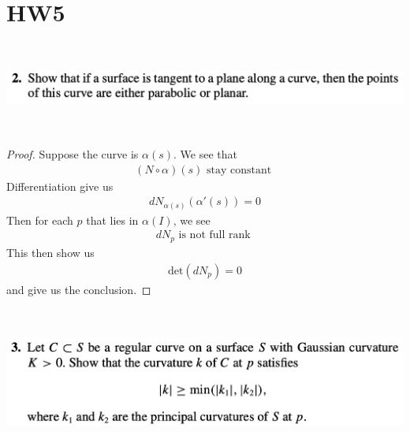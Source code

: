 \documentclass{report}
\begin{document}
\section{HW5}
\begin{question}{}{}
\includegraphics[height=3cm,width=18cm]{hw5q1}
\end{question}
\begin{proof}
Suppose the curve is $\alpha (s)$. We see that 
\begin{align*}
  (N\circ \alpha)(s)\text{ stay constant } 
\end{align*}
Differentiation give us 
\begin{align*}
dN_{\alpha (s)}(\alpha '(s))=0
\end{align*}
Then for each $p$ that lies in $\alpha (I)$, we see 
\begin{align*}
dN_p\text{ is not full rank }
\end{align*}
This then show us 
\begin{align*}
\text{det}(dN_p)=0
\end{align*}
and give us the conclusion.
\end{proof}
\begin{question}{}{}
\includegraphics[height=5cm,width=18cm]{hw5q2}
\end{question}
\end{document}
